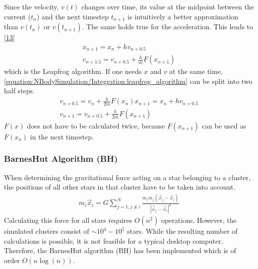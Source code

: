 \documentclass[letterpaper,10pt,english]{sphinxmanual}
\begin{document}
				\sphinxAtStartPar
				Since the velocity, \(v(t)\) changes over time, its value at the midpoint between the current (\(t_n\)) and the next timestep \(t_{n+1}\) is intuitively a better approximation than
				\(v(t_n)\) or \(v(t_{n+1})\). The same holds true for the acceleration. This leads to {[}\hyperlink{cite.NBodySimulation/Appendix:id27}{13}{]}
				\begin{equation}\label{equation:NBodySimulation/Integration:leapfrog_algorithm}
				\begin{split}x_{n+1} = x_{n} + hv_{n+0.5}\\
				v_{n+1.5} = v_{n+0.5} + \frac{h}{m}F(x_{n+1})\end{split}
				\end{equation}
				\sphinxAtStartPar
				which is the Leapfrog algorithm. If one needs \(x\) and \(v\) at the same time, \eqref{equation:NBodySimulation/Integration:leapfrog_algorithm} can be split into two half steps.
				\begin{equation*}
				\begin{split}v_{n+0.5} = v_{n} + \frac{h}{2m}F(x_{n})
				x_{n+1} = x_{n} + hv_{n+0.5}\\
				v_{n+1} = v_{n+0.5} + \frac{h}{2m}F(x_{n+1})\end{split}
				\end{equation*}
				\sphinxAtStartPar
				\(F(x)\) does not have to be calculated twice, because \(F(x_{n+1})\) can be used as \(F(x_{n})\) in the next timestep.
			
			
			\subsubsection{Barnes\sphinxhyphen{}Hut Algorithm (BH)}
				\label{\detokenize{NBodySimulation/Integration:barnes-hut-algorithm-bh}}
				\sphinxAtStartPar
				When determining the gravitational force acting on a star belonging to a cluster, the positions of all other stars in that cluster
				have to be taken into account.
				\begin{equation*}
				\begin{split}m_i\vec{x}_i = G\sum_{j=1,j\not\equiv i}^{N}\frac{m_im_j\left ( \vec{x}_j-\vec{x}_i \right )}{\left | \vec{x}_j-\vec{x}_i \right |^3}\end{split}
				\end{equation*}
				\sphinxAtStartPar
				Calculating this force for all stars requires \(O(n^2)\) operations.
				However, the simulated clusters consist of \(\sim 10^4 - 10^5\) stars.
				While the resulting number of calculations is possible, it is not feasible for a typical desktop computer.
				Therefore, the Barnes\sphinxhyphen{}Hut algorithm (BH) has been implemented which is of order \(O(n\log(n))\).
				
\end{document}
